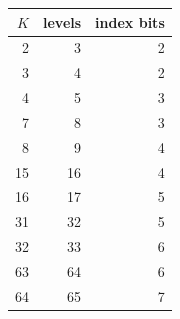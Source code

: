 \begin{tabular}{@{}rrr@{}}
\toprule
$K$ & levels & index bits \\
\midrule
2 & 3 & 2 \\
3 & 4 & 2 \\
4 & 5 & 3 \\
7 & 8 & 3 \\
8 & 9 & 4 \\
15 & 16 & 4 \\
16 & 17 & 5 \\
31 & 32 & 5 \\
32 & 33 & 6 \\
63 & 64 & 6 \\
64 & 65 & 7 \\
\bottomrule
\end{tabular}
